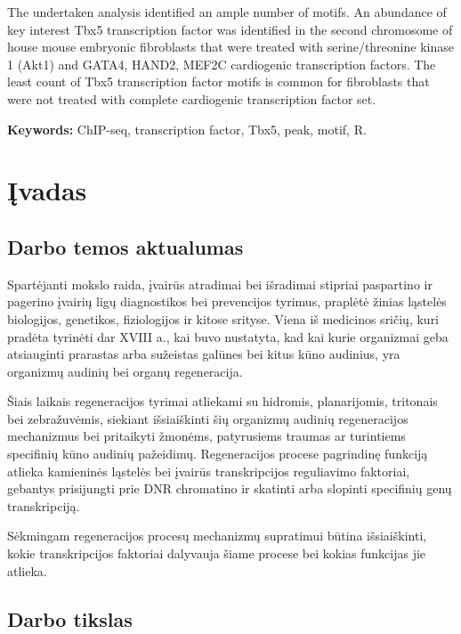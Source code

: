 \documentclass[12pt]{article}
\begin{document}
The undertaken analysis identified an ample number of motifs. An abundance
of key interest Tbx5 transcription factor was identified in the second
chromosome of house mouse embryonic fibroblasts that were treated with
serine/threonine kinase 1 (Akt1) and GATA4, HAND2, MEF2C cardiogenic
transcription factors. The least count of Tbx5 transcription factor motifs
is common for fibroblasts that were not treated with complete cardiogenic
transcription factor set. 

\hfill \break
\textbf{Keywords:} ChIP-seq, transcription factor, Tbx5, peak, motif, R.
\newpage


\section{Įvadas}
\subsection*{Darbo temos aktualumas}

Spartėjanti mokslo raida, įvairūs atradimai bei išradimai stipriai paspartino
ir pagerino įvairių ligų diagnostikos bei prevencijos tyrimus, praplėtė žinias
ląstelės biologijos, genetikos, fiziologijos ir kitose srityse. Viena iš
medicinos sričių, kuri pradėta tyrinėti dar XVIII a., kai buvo nustatyta, kad
kai kurie organizmai geba atsiauginti prarastas arba sužeistas galūnes bei
kitus kūno audinius\cite{REGENERATION}, yra organizmų audinių bei organų
regeneracija.

Šiais laikais regeneracijos tyrimai atliekami su hidromis, planarijomis,
tritonais bei zebražuvėmis\cite{ORGANISMS}, siekiant išsiaiškinti šių organizmų
audinių regeneracijos mechanizmus bei pritaikyti žmonėms, patyrusiems traumas
ar turintiems specifinių kūno audinių pažeidimų. Regeneracijos procese
pagrindinę funkciją atlieka kamieninės ląstelės bei įvairūs transkripcijos
reguliavimo faktoriai, gebantys prisijungti prie DNR chromatino ir skatinti
arba slopinti specifinių genų transkripciją.

Sėkmingam regeneracijos procesų mechanizmų supratimui būtina išsiaiškinti, 
kokie transkripcijos faktoriai dalyvauja šiame procese bei kokias funkcijas jie
atlieka.

\subsection*{Darbo tikslas}
\end{document}
